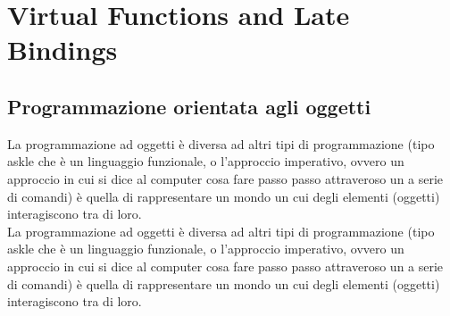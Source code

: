 \documentclass{report}
\begin{document}
\tableofcontents
\newpage

\chapter{Virtual Functions and Late Bindings}
\section{Programmazione orientata agli oggetti}
La programmazione ad oggetti è diversa ad altri tipi di programmazione (tipo askle che è un linguaggio funzionale, o l'approccio imperativo, ovvero  un approccio in cui si dice al computer cosa fare passo passo attraveroso un a serie di comandi) è quella di rappresentare un mondo un cui degli elementi (oggetti) interagiscono tra di loro. \\

La programmazione ad oggetti è diversa ad altri tipi di programmazione (tipo askle che è un linguaggio funzionale, o l'approccio imperativo, ovvero  un approccio in cui si dice al computer cosa fare passo passo attraveroso un a serie di comandi) è quella di rappresentare un mondo un cui degli elementi (oggetti) interagiscono tra di loro. \\
\end{document}
